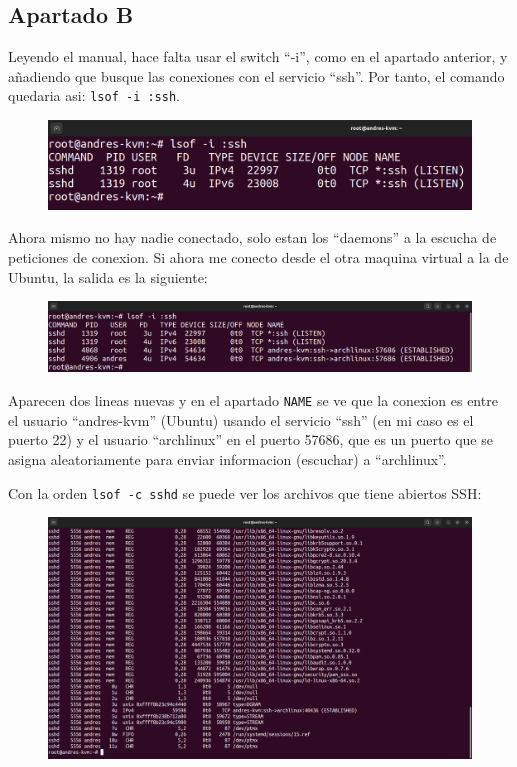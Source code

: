 \documentclass{article}
\begin{document}
\subsection*{Apartado B}
Leyendo el manual, hace falta usar el switch ``-i'', como en el apartado anterior, y añadiendo que busque las conexiones con el servicio ``ssh''. Por tanto, el comando quedaria asi: \verb|lsof -i :ssh|.

\begin{figure}[H]
    \includegraphics[width=\textwidth]{imagenes/lsofisshlisten.png}
\end{figure}

Ahora mismo no hay nadie conectado, solo estan los ``daemons'' a la escucha de peticiones de conexion. Si ahora me conecto desde el otra maquina virtual a la de Ubuntu, la salida es la siguiente:

\begin{figure}[H]
    \includegraphics[width=\textwidth]{imagenes/lsofissharch.png}
\end{figure}

Aparecen dos lineas nuevas y en el apartado \verb|NAME| se ve que la conexion es entre el usuario ``andres-kvm'' (Ubuntu) usando el servicio ``ssh'' (en mi caso es el puerto 22)  y el usuario ``archlinux'' en el puerto 57686, que es un puerto que se asigna aleatoriamente para enviar informacion (escuchar) a ``archlinux''.

Con la orden \verb|lsof -c sshd| se puede ver los archivos que tiene abiertos SSH:

\begin{figure}[H]
    \includegraphics[width=\textwidth]{imagenes/lsofcsshd.png}
\end{figure}
\end{document}
